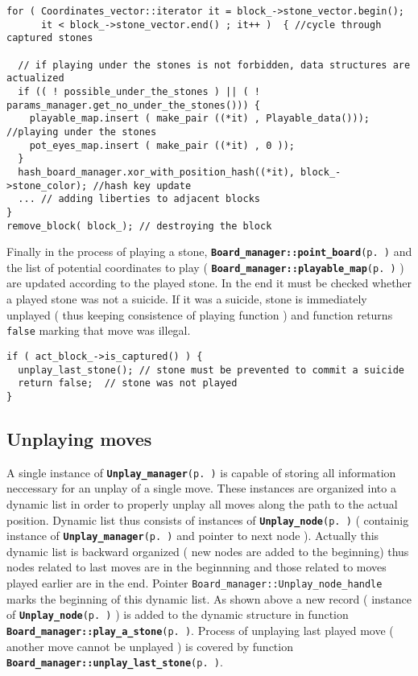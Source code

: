 \footnotesize\begin{verbatim}for ( Coordinates_vector::iterator it = block_->stone_vector.begin(); 
      it < block_->stone_vector.end() ; it++ )  { //cycle through captured stones

  // if playing under the stones is not forbidden, data structures are actualized
  if (( ! possible_under_the_stones ) || ( ! params_manager.get_no_under_the_stones())) {
    playable_map.insert ( make_pair ((*it) , Playable_data())); //playing under the stones
    pot_eyes_map.insert ( make_pair ((*it) , 0 ));  
  }
  hash_board_manager.xor_with_position_hash((*it), block_->stone_color); //hash key update
  ... // adding liberties to adjacent blocks 
}
remove_block( block_); // destroying the block
\end{verbatim}
\normalsize


Finally in the process of playing a stone, {\tt {\bf Board\_\-manager::point\_\-board}{\rm (p.\,\pageref{classBoard__manager_o5})}} and the list of potential coordinates to play ( {\tt {\bf Board\_\-manager::playable\_\-map}{\rm (p.\,\pageref{classBoard__manager_r2})}} ) are updated according to the played stone. In the end it must be checked whether a played stone was not a suicide. If it was a suicide, stone is immediately unplayed ( thus keeping consistence of playing function ) and function returns {\tt false} marking that move was illegal. 

\footnotesize\begin{verbatim}if ( act_block_->is_captured() ) { 
  unplay_last_stone(); // stone must be prevented to commit a suicide
  return false;  // stone was not played 
}
\end{verbatim}
\normalsize
\subsection{Unplaying moves}\label{page_6_page_6__sec_4}
A single instance of {\tt {\bf Unplay\_\-manager}{\rm (p.\,\pageref{structUnplay__manager})}} is capable of storing all information neccessary for an unplay of a single move. These instances are organized into a dynamic list in order to properly unplay all moves along the path to the actual position. Dynamic list thus consists of instances of {\tt {\bf Unplay\_\-node}{\rm (p.\,\pageref{structUnplay__node})}} ( containig instance of {\tt {\bf Unplay\_\-manager}{\rm (p.\,\pageref{structUnplay__manager})}} and pointer to next node ). Actually this dynamic list is backward organized ( new nodes are added to the beginning) thus nodes related to last moves are in the beginnning and those related to moves played earlier are in the end. Pointer {\tt Board\_\-manager::Unplay\_\-node\_\-handle} marks the beginning of this dynamic list. As shown above a new record ( instance of {\tt {\bf Unplay\_\-node}{\rm (p.\,\pageref{structUnplay__node})}} ) is added to the dynamic structure in function {\tt {\bf Board\_\-manager::play\_\-a\_\-stone}{\rm (p.\,\pageref{classBoard__manager_a4})}}. Process of unplaying last played move ( another move cannot be unplayed ) is covered by function {\tt {\bf Board\_\-manager::unplay\_\-last\_\-stone}{\rm (p.\,\pageref{classBoard__manager_a16})}}.

